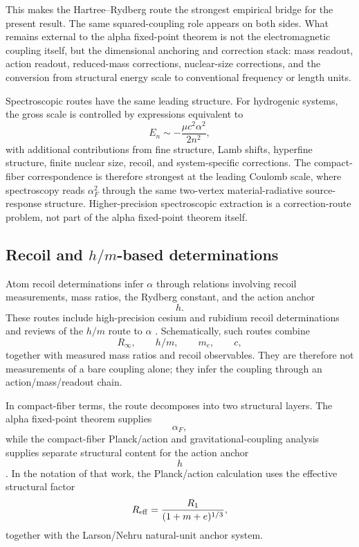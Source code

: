 This makes the Hartree--Rydberg route the strongest empirical bridge for
the present result. The same squared-coupling role appears on both sides.
What remains external to the alpha fixed-point theorem is not the
electromagnetic coupling itself, but the dimensional anchoring and
correction stack: mass readout, action readout, reduced-mass corrections,
nuclear-size corrections, and the conversion from structural energy scale
to conventional frequency or length units.

Spectroscopic routes have the same leading structure. For hydrogenic
systems, the gross scale is controlled by expressions equivalent to
\[
E_n\sim -\frac{\mu c^2\alpha^2}{2n^2},
\]
with additional contributions from fine structure, Lamb shifts, hyperfine
structure, finite nuclear size, recoil, and system-specific corrections.
The compact-fiber correspondence is therefore strongest at the leading
Coulomb scale, where spectroscopy reads \(\alpha_F^2\) through the same
two-vertex material-radiative source-response structure. Higher-precision
spectroscopic extraction is a correction-route problem, not part of the
alpha fixed-point theorem itself.

\subsection{\texorpdfstring{Recoil and \(h/m\)-based determinations}{Recoil and h/m-based determinations}}

Atom recoil determinations infer \(\alpha\) through relations involving
recoil measurements, mass ratios, the Rydberg constant, and the action
anchor
\[
h.
\]
These routes include high-precision cesium and rubidium recoil
determinations and reviews of the \(h/m\) route to \(\alpha\)
\cite{Parker2018_alpha_Cs,Morel2020_alpha_Rb,
Clade2019_alpha_h_over_m_review}. Schematically, such routes combine
\[
R_\infty,
\qquad
h/m,
\qquad
m_e,
\qquad
c,
\]
together with measured mass ratios and recoil observables. They are
therefore not measurements of a bare coupling alone; they infer the
coupling through an action/mass/readout chain.

In compact-fiber terms, the route decomposes into two structural layers.
The alpha fixed-point theorem supplies
\[
\alpha_F,
\]
while the compact-fiber Planck/action and gravitational-coupling analysis
supplies separate structural content for the action anchor
\[
h
\]
\cite{Wells2026PlanckGravity}. In the notation of that work, the
Planck/action calculation uses the effective structural factor
\[
R_{\rm eff}
=
\frac{R_1}{(1+m+e)^{1/3}},
\]
together with the Larson/Nehru natural-unit anchor system.

